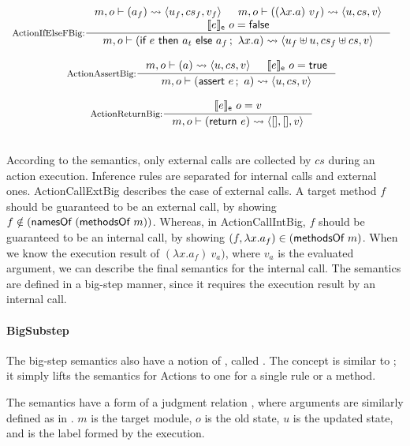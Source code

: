 \begin{definition}
\begin{center}
\begin{math}
\begin{array}{c}
        \mbox{} \\
        \inference[ActionIfElseFBig:]{\sembigact{m}{o}{a_f}{u_f}{cs_f}{v_f} &
          \sembigact{m}{o}{(\lambda x.a)\ v_f}{u}{cs}{v} \\
          \semexpr{e}{o} = \bfalse{}}
                  {\sembigact{m}{o}{\actifelse{e}{a_t}{a_f}{x}{a}}{\splus{u_f}{u}}{\splus{cs_f}{cs}}{v}} \\
        \mbox{} \\
        \inference[ActionAssertBig:]{\sembigact{m}{o}{a}{u}{cs}{v} & \semexpr{e}{o} = \btrue{}}
                  {\sembigact{m}{o}{\actassert{e}{a}}{u}{cs}{v}} \\
        \mbox{} \\
        \inference[ActionReturnBig:]{\semexpr{e}{o} = v}
                  {\sembigact{m}{o}{\actret{e}}{\emptymap{}}{\emptymap{}}{v}} \\
        \mbox{} \\
      \end{array}
    \end{math}
  \end{center}
\end{definition}

According to the semantics, only external calls are collected by $cs$
during an action execution. Inference rules are separated for internal
calls and external ones. ActionCallExtBig describes the case of
external calls. A target method $f$ should be guaranteed to be an
external call, by showing $f \notin (\textsf{namesOf}\ (\textsf{methodsOf}\ m))$.
Whereas, in ActionCallIntBig, $f$ should be guaranteed to be an
internal call, by showing $(f, \lambda x.a_f) \in
(\textsf{methodsOf}\ m)$. When we know the execution result of $(\lambda
x.a_f)\ v_a)$, where $v_a$ is the evaluated argument, we can describe
the final semantics for the internal call. The semantics are defined
in a big-step manner, since it requires the execution result by an
internal call.

\paragraph{BigSubstep}

The big-step semantics also have a notion of \Substep{}, called
\Bigsubstep{}. The concept is similar to \Substep{}; it simply lifts
the semantics for Actions to one for a single rule or a method.

The \Bigsubstep{} semantics have a form of a judgment relation
, where arguments are similarly
defined as in \Substep{}. $m$ is the target module, $o$ is the old
state, $u$ is the updated state, and  is the
label formed by the execution.

